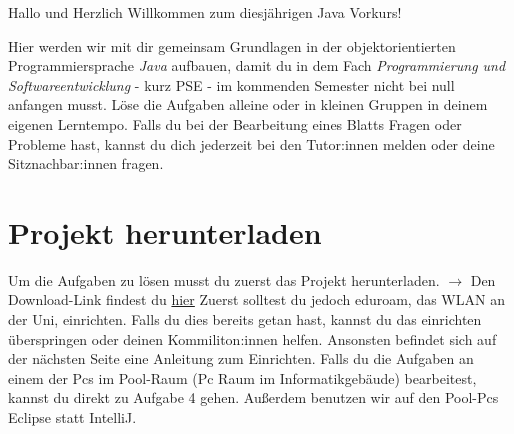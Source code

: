 \begin{center}
	Hallo und Herzlich Willkommen zum diesjährigen Java Vorkurs!\\
\end{center}
Hier werden wir mit dir gemeinsam Grundlagen in der objektorientierten Programmiersprache \textit{Java} aufbauen, damit du in dem Fach \textit{Programmierung und Softwareentwicklung} - kurz PSE - im kommenden Semester nicht bei null anfangen musst.\newline
Löse die Aufgaben alleine oder in kleinen Gruppen in deinem eigenen Lerntempo.\newline
Falls du bei der Bearbeitung eines Blatts Fragen oder Probleme hast, kannst du dich jederzeit bei den Tutor:innen melden oder deine Sitznachbar:innen fragen.\newline

\section*{Projekt herunterladen}
Um die Aufgaben zu lösen musst du zuerst das Projekt herunterladen.\newline
$\rightarrow$ Den Download-Link findest du \href{\jvkpackageurl}{hier}\newline
Zuerst solltest du jedoch eduroam, das WLAN an der Uni, einrichten. 
Falls du dies bereits getan hast, kannst du das einrichten überspringen oder deinen Kommiliton:innen helfen. 
Ansonsten befindet sich auf der nächsten Seite eine Anleitung zum Einrichten.
Falls du die Aufgaben an einem der Pcs im Pool-Raum (Pc Raum im Informatikgebäude) bearbeitest, kannst du direkt zu Aufgabe 4 gehen. Außerdem benutzen wir auf den Pool-Pcs Eclipse statt IntelliJ.
\newpage
